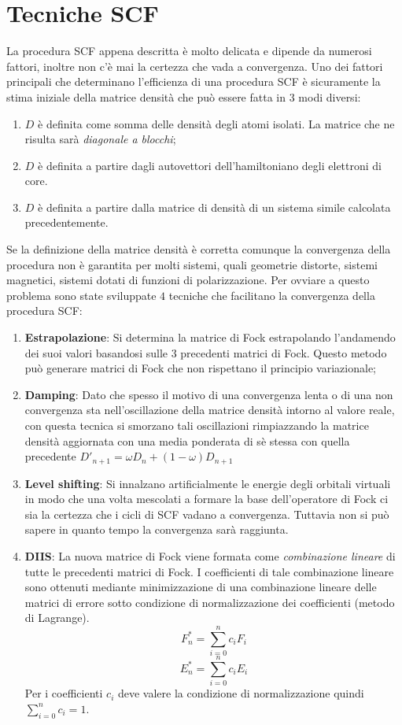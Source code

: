 \documentclass[oneside]{amsbook}
\numberwithin{section}{chapter}
\numberwithin{equation}{section}
\numberwithin{figure}{section}
\begin{document}
\section{Tecniche SCF}
La procedura SCF appena descritta è molto delicata e dipende da numerosi fattori, inoltre non c'è mai la certezza che vada a convergenza.
Uno dei fattori principali che determinano l'efficienza di una procedura SCF è sicuramente la stima iniziale della matrice densità che può essere fatta in $3$ modi diversi:
\begin{enumerate}
\item $D$ è definita come somma delle densità degli atomi isolati. La matrice che ne risulta sarà \emph{diagonale a blocchi};
\item $D$ è definita a partire dagli autovettori dell'hamiltoniano degli elettroni di core.
\item $D$ è definita a partire dalla matrice di densità di un sistema simile calcolata precedentemente.
\end{enumerate}
Se la definizione della matrice densità è corretta comunque la convergenza della procedura non è garantita per molti sistemi, quali geometrie distorte, sistemi magnetici, sistemi dotati di funzioni di polarizzazione. Per ovviare a questo problema sono state sviluppate $4$ tecniche che facilitano la convergenza della procedura SCF:
\begin{enumerate}
\item \textbf{Estrapolazione}: Si determina la matrice di Fock estrapolando l'andamendo dei suoi valori basandosi sulle $3$ precedenti matrici di Fock. Questo metodo può generare matrici di Fock che non rispettano il principio variazionale;
\item \textbf{Damping}: Dato che spesso il motivo di una convergenza lenta o di una non convergenza sta nell'oscillazione della matrice densità intorno al valore reale, con questa tecnica si smorzano tali oscillazioni rimpiazzando la matrice densità aggiornata con una media ponderata di sè stessa con quella precedente $D'_{n+1}= \omega D_n +(1- \omega) D_{n+1}$
\item \textbf{Level shifting}: Si innalzano artificialmente le energie degli orbitali virtuali in modo che una volta mescolati a formare la base dell'operatore di Fock ci sia la certezza che i cicli di SCF vadano a convergenza. Tuttavia non si può sapere in quanto tempo la convergenza sarà raggiunta.
\item \textbf{DIIS}: La nuova matrice di Fock viene formata come \emph{combinazione lineare} di tutte le precedenti matrici di Fock. I coefficienti di tale combinazione lineare sono ottenuti mediante minimizzazione di una combinazione lineare delle matrici di errore sotto condizione di normalizzazione dei coefficienti (metodo di Lagrange).
\begin{equation}
F^* _n =\sum \limits _{i=0} ^nc_iF_i
\end{equation}
\begin{equation}
E^* _n =\sum \limits _{i=0} ^nc_iE_i
\end{equation}
Per i coefficienti $c_i$ deve valere la condizione di normalizzazione quindi $\sum \limits _{i=0}^n c_i =1$.
\end{enumerate}
\end{document}
